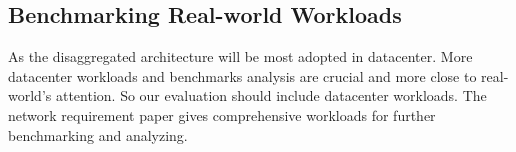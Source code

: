 \documentclass[twocolumn]{article}
\begin{document}
\subsection{Benchmarking Real-world Workloads}                  
As the disaggregated architecture will be most adopted in datacenter. More datacenter workloads and benchmarks analysis are crucial and more close to real-world's attention. So our evaluation should include datacenter workloads. The network requirement paper \cite{Network_requirement} gives comprehensive workloads for further benchmarking and analyzing.

{}

\end{document}
